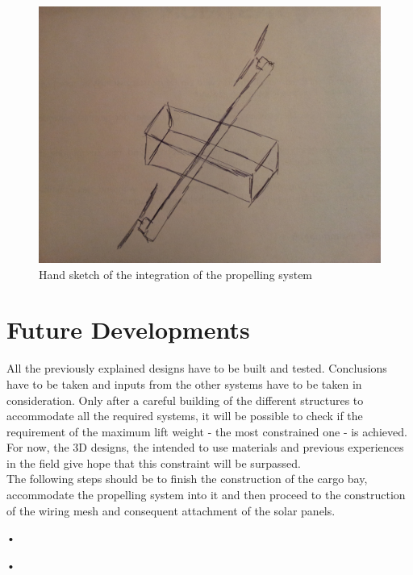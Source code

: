 \begin{figure}[bht]
\centering
\includegraphics[scale=0.5]{figures/prop.jpg}
\caption{Hand sketch of the integration of the propelling system}
\label{fig:prop}
\end{figure}

\section{Future Developments}

All the previously explained designs have to be built and tested. Conclusions have to be taken and inputs from the other systems have to be taken in consideration. Only after a careful building of the different structures to accommodate all the required systems, it will be possible to check if the requirement of the maximum lift weight - the most constrained one - is achieved. For now, the 3D designs, the intended to use materials and previous experiences in the field give hope that this constraint will be surpassed. \\
The following steps should be to finish the construction of the cargo bay, accommodate the propelling system into it and then proceed to the construction of the wiring mesh and consequent attachment of the solar panels.

\begin{scriptsize}
{\footnotesize •\begin{small}
{\normalsize •}
\end{small}}
\end{scriptsize}

